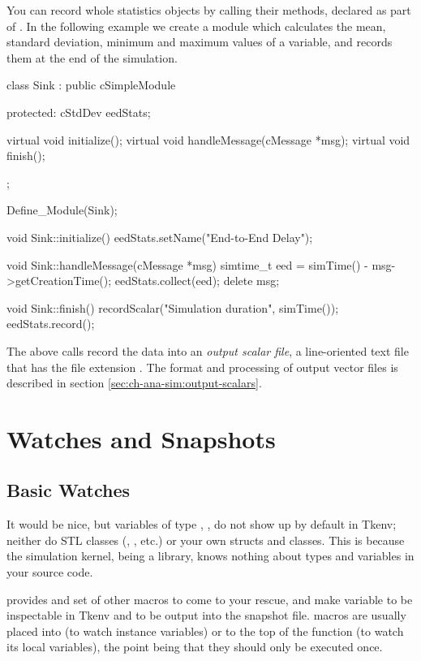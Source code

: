 You can record whole statistics objects by calling their 
methods, declared as part of . In the following example
we create a  module which calculates the mean, standard
deviation, minimum and maximum values of a variable, and records them at the
end of the simulation.

\begin{cpp}
class Sink : public cSimpleModule
{
  protected:
    cStdDev eedStats;

    virtual void initialize();
    virtual void handleMessage(cMessage *msg);
    virtual void finish();
};

Define_Module(Sink);

void Sink::initialize()
{
    eedStats.setName("End-to-End Delay");
}

void Sink::handleMessage(cMessage *msg)
{
    simtime_t eed = simTime() - msg->getCreationTime();
    eedStats.collect(eed);
    delete msg;
}

void Sink::finish()
{
    recordScalar("Simulation duration", simTime());
    eedStats.record();
}
\end{cpp}

The above calls record the data into an \textit{output scalar file},
a line-oriented text file that has the file extension .
The format and processing of output vector files is described in section
\ref{sec:ch-ana-sim:output-scalars}.



\section{Watches and Snapshots}

\subsection{Basic Watches}

It would be nice, but variables of type , , 
do not show up by default in Tkenv; neither do STL classes
(, , etc.) or your own structs and
classes. This is because the simulation kernel, being a library, knows
nothing about types and variables in your source code.

{\opp} provides  and set of other macros to come to your rescue,
and make variable to be inspectable in Tkenv and to be output into the snapshot
file.  macros are usually placed into
 (to watch instance variables) or to the top of the
 function (to watch its local variables), the point being
that they should only be executed once.

